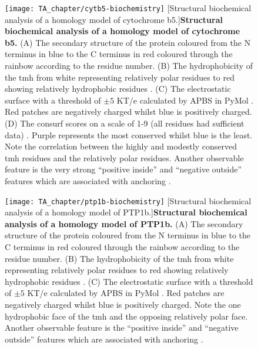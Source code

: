 \begin{figure}[!ht]
\centering
\texttt{[image: TA\_chapter/cytb5-biochemistry]}
        [Structural biochemical analysis of a homology model of cytochrome b5.]{\textbf{Structural biochemical analysis of a homology model of cytochrome b5.}
        (A) The secondary structure of the protein coloured from the N terminus in blue to the C terminus in red coloured through the rainbow according to the residue number.
        (B) The hydrophobicity of the \gls{tmh} from white representing relatively polar residues to red showing relatively hydrophobic residues \cite{Eisenberg1984}.
        (C) The electrostatic surface with a threshold of $\pm5$ KT/e calculated by APBS in PyMol \cite{Baker2001}.
        Red patches are negatively charged whilst blue is positively charged.
        (D) The consurf scores on a scale of 1-9 (all residues had sufficient data) \cite{Ashkenazy2010}. Purple represents the most conserved whilst blue is the least.
        Note the correlation between the highly and modestly conserved \gls{tmh} residues and the relatively polar residues.
        Another observable feature is the very strong ``positive inside'' \cite{VonHeijne1989, Andersson1992, Sharpe2010, Baeza-Delgado2013, Pogozheva2013} and ``negative outside'' features which are associated with anchoring \cite{Baker2017}.
}

\label{fig:cytb5-biochemistry}
\end{figure}


\begin{figure}[!ht]
\centering
\texttt{[image: TA\_chapter/ptp1b-biochemistry]}
        [Structural biochemical analysis of a homology model of PTP1b.]{\textbf{Structural biochemical analysis of a homology model of PTP1b.}
        (A) The secondary structure of the protein coloured from the N terminus in blue to the C terminus in red coloured through the rainbow according to the residue number.
        (B) The hydrophobicity of the \gls{tmh} from white representing relatively polar residues to red showing relatively hydrophobic residues \cite{Eisenberg1984}.
        (C) The electrostatic surface with a threshold of $\pm5$ KT/e calculated by APBS in PyMol \cite{Baker2001}.
        Red patches are negatively charged whilst blue is positively charged.
        Note the one hydrophobic face of the \gls{tmh} and the opposing relatively polar face.
        Another observable feature is the ``positive inside'' \cite{VonHeijne1989, Andersson1992, Sharpe2010, Baeza-Delgado2013, Pogozheva2013} and ``negative outside'' features which are associated with anchoring \cite{Baker2017}.
}

\label{fig:ptp1b-biochemistry}
\end{figure}

